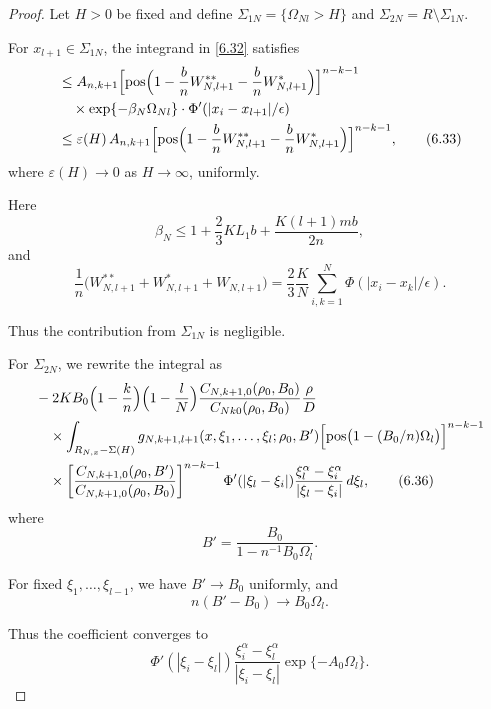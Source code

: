 \documentclass[11pt]{article}
\begin{document}
\begin{proof}
Let $H>0$ be fixed and define $\Sigma_{1N} = \{\Omega_{Nl} > H\}$ and
$\Sigma_{2N} = R \setminus \Sigma_{1N}$.

For $x_{l+1} \in \Sigma_{1N}$, the integrand in \eqref{6.32} satisfies
\begin{align}
&\le
A_{n,k+1}
\Bigl[
\operatorname{pos}\Bigl(
1-\frac{b}{n}W^{**}_{N,l+1}
-\frac{b}{n}W^{*}_{N,l+1}
\Bigr)
\Bigr]^{n-k-1}
\nonumber\\
&\quad\times
\exp\{-\beta_N \Omega_{Nl}\}
\cdot \Phi'(|x_i - x_{l+1}|/\epsilon)
\nonumber\\
&\le
\varepsilon(H)\,A_{n,k+1}
\Bigl[
\operatorname{pos}\Bigl(
1-\frac{b}{n}W^{**}_{N,l+1}
-\frac{b}{n}W^{*}_{N,l+1}
\Bigr)
\Bigr]^{n-k-1},
\tag{6.33}\label{6.33}
\end{align}
where $\varepsilon(H)\to 0$ as $H\to\infty$, uniformly.

Here
\begin{equation}
\beta_N \le 1 + \frac{2}{3}KL_1b + \frac{K(l+1)mb}{2n},
\tag{6.34}\label{6.34}
\end{equation}
and
\begin{equation}
\frac{1}{n}\bigl(W^{**}_{N,l+1} + W^{*}_{N,l+1} + W_{N,l+1}\bigr)
=
\frac{2}{3}\frac{K}{N}
\sum_{i,k=1}^N \Phi(|x_i-x_k|/\epsilon).
\tag{6.35}\label{6.35}
\end{equation}

Thus the contribution from $\Sigma_{1N}$ is negligible.

For $\Sigma_{2N}$, we rewrite the integral as
\begin{align}
&-2K B_0\Bigl(1-\frac{k}{n}\Bigr)\Bigl(1-\frac{l}{N}\Bigr)
\frac{C_{N,k+1,0}(\rho_0,B_0)}{C_{Nk0}(\rho_0,B_0)}
\frac{\rho}{D}
\nonumber\\
&\quad\times
\int_{R_{N,x}-\Sigma(H)}
g_{N,k+1,l+1}(x,\xi_1,\dots,\xi_l;\rho_0,B')
\Bigl[
\operatorname{pos}\bigl(1-(B_0/n)\Omega_l\bigr)
\Bigr]^{n-k-1}
\nonumber\\
&\quad\times
\left[
\frac{C_{N,k+1,0}(\rho_0,B')}{C_{N,k+1,0}(\rho_0,B_0)}
\right]^{n-k-1}
\Phi'(|\xi_l-\xi_i|)
\frac{\xi_l^\alpha - \xi_i^\alpha}{|\xi_l - \xi_i|}
\,d\xi_l,
\tag{6.36}\label{6.36}
\end{align}
where
\[
B' = \frac{B_0}{1 - n^{-1} B_0 \Omega_l}.
\]

For fixed $\xi_1,\dots,\xi_{l-1}$, we have $B'\to B_0$ uniformly, and
\[
n(B' - B_0) \to B_0 \Omega_l.
\]

Thus the coefficient converges to
\begin{equation}
\Phi'(|\xi_i - \xi_l|)
\frac{\xi_i^\alpha - \xi_l^\alpha}{|\xi_i - \xi_l|}
\exp\{-A_0 \Omega_l\}.
\tag{6.37}\label{6.37}
\end{equation}


\end{proof}
\end{document}
